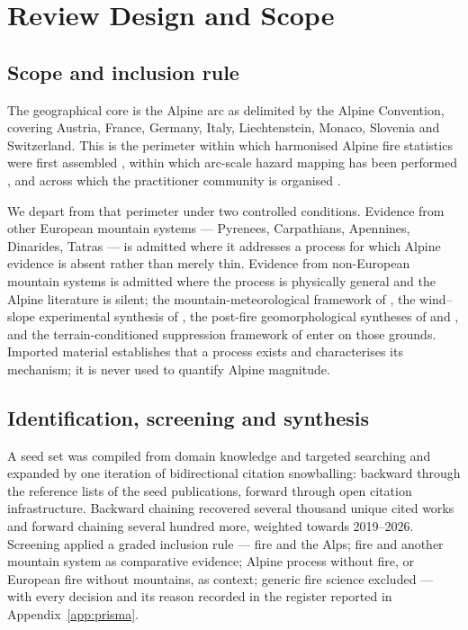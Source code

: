 \documentclass[11pt,a4paper]{article}
\begin{document}
\section{Review Design and Scope}

\subsection{Scope and inclusion rule}

The geographical core is the Alpine arc as delimited by the Alpine Convention, covering Austria, France, Germany, Italy, Liechtenstein, Monaco, Slovenia and Switzerland. This is the perimeter within which harmonised Alpine fire statistics were first assembled \citep{valese_wildfires_2011, muller_forest_2020}, within which arc-scale hazard mapping has been performed \citep{gerberding_mapping_2025}, and across which the practitioner community is organised \citep{hoang_stakeholders_2026}.

We depart from that perimeter under two controlled conditions. Evidence from other European mountain systems --- Pyrenees, Carpathians, Apennines, Dinarides, Tatras --- is admitted where it addresses a process for which Alpine evidence is absent rather than merely thin. Evidence from non-European mountain systems is admitted where the process is physically general and the Alpine literature is silent; the mountain-meteorological framework of \citet{sharples_overview_2009}, the wind--slope experimental synthesis of \citet{hayajneh_wind_2026}, the post-fire geomorphological syntheses of \citet{santi_wildfire_2022} and \citet{morell_sediment_2021}, and the terrain-conditioned suppression framework of \citet{cardil_assessing_2025} enter on those grounds. Imported material establishes that a process exists and characterises its mechanism; it is never used to quantify Alpine magnitude.

\subsection{Identification, screening and synthesis}

A seed set was compiled from domain knowledge and targeted searching and expanded by one iteration of bidirectional citation snowballing: backward through the reference lists of the seed publications, forward through open citation infrastructure. Backward chaining recovered several thousand unique cited works and forward chaining several hundred more, weighted towards 2019--2026. Screening applied a graded inclusion rule --- fire and the Alps; fire and another mountain system as comparative evidence; Alpine process without fire, or European fire without mountains, as context; generic fire science excluded --- with every decision and its reason recorded in the register reported in Appendix~\ref{app:prisma}.
\end{document}
